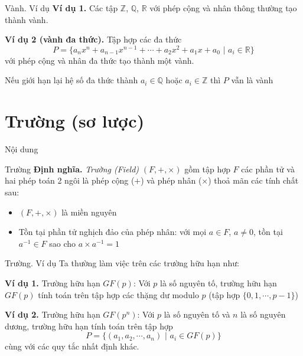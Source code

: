 \documentclass{beamer}
\begin{document}
\begin{frame}{Vành. Ví dụ}
    \textbf{Ví dụ 1.} Các tập $\mathbb{Z}$, $\mathbb{Q}$, $\mathbb{R}$ với phép cộng và nhân thông thường tạo thành vành. \pause

    \textbf{Ví dụ 2 (vành đa thức).} Tập hợp các đa thức $$P = \{a_n x^n + a_{n-1} x^{n-1} + \cdots + a_2 x^2 + a_1 x + a_0 \text{ | } a_i \in \mathbb{R}\}$$ với phép cộng và nhân đa thức tạo thành một vành. \pause
    
    Nếu giới hạn lại hệ số đa thức thành $a_i \in \mathbb{Q}$ hoặc $a_i \in \mathbb{Z}$ thì $P$ vẫn là vành
\end{frame}
\section{Trường (sơ lược)}
\begin{frame}{Nội dung}
    \tableofcontents[
        currentsection,
        sectionstyle=show/shaded,
        subsectionstyle=show/show/hide
    ]
\end{frame}
\begin{frame}{Trường}
    \textbf{Định nghĩa.} \textit{Trường (Field)} $(F, +, \times)$ gồm tập hợp $F$ các phần tử và hai phép toán 2 ngôi là phép cộng ($+$) và phép nhân ($\times$) thoả mãn các tính chất sau:
    \begin{itemize}
        \item $(F, +, \times)$ là miền nguyên
        \item Tồn tại phần tử nghịch đảo của phép nhân: với mọi $a \in F$, $a \neq 0$, tồn tại $a^{-1} \in F$ sao cho $a \times a^{-1} = 1$
    \end{itemize}
\end{frame}

\begin{frame}{Trường. Ví dụ}
    Ta thường làm việc trên các trường hữu hạn như:
    
    \textbf{Ví dụ 1.} Trường hữu hạn $GF(p)$: Với $p$ là số nguyên tố, trường hữu hạn $GF(p)$ tính toán trên tập hợp các thặng dư modulo $p$ (tập hợp $\{0, 1, \cdots, p-1\}$)
    
    \textbf{Ví dụ 2.} Trường hữu hạn $GF(p^n)$: Với $p$ là số nguyên tố và $n$ là số nguyên dương, trường hữu hạn tính toán trên tập hợp $$ P = \{(a_1, a_2, \cdots, a_n) \text{ | } a_i \in GF(p)\}$$ cùng với các quy tắc nhất định khác.
\end{frame}
\end{document}
